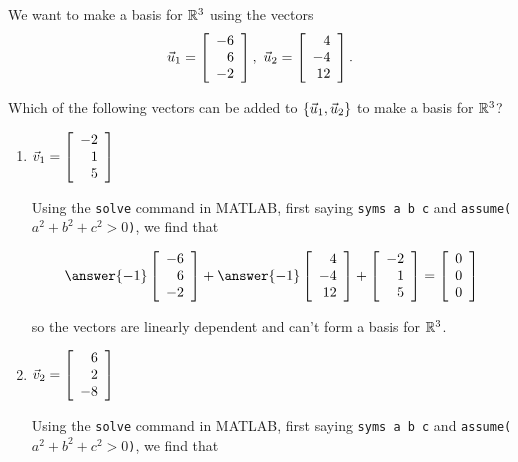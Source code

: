\documentclass{ximera}
\author{Zack Reed}
\begin{document}
\begin{exercise}

    We want to make a basis for $\R^3$ using the vectors
    \begin{equation*}
      \vect{u}_1 = \startmat{r} -6 \\ 6 \\ -2\stopmat,\quad
      \vect{u}_2 =\startmat{r} 4 \\ -4 \\ 12\stopmat.
    \end{equation*}

    Which of the following vectors can be added to $\set{\vect{u}_1,\vect{u}_2}$ to make a basis for $\R^3$?

    \begin{enumerate}
    \item $\vect{v}_1 = \startmat{r} -2 \\ 1 \\ 5\stopmat$ 
    \begin{problem}

        Using the \texttt{solve} command in MATLAB, first saying \texttt{syms a b c} and \texttt{assume($a^2+b^2+c^2>0$)}, we find that

        \begin{equation*}
        \answer{-1}\startmat{r} -6 \\ 6 \\ -2\stopmat + \answer{-1}\startmat{r} 4 \\ -4 \\ 12\stopmat + \startmat{r} -2 \\ 1 \\ 5\stopmat = \startmat{r} 0 \\ 0 \\ 0\stopmat
        \end{equation*}

        so the vectors are linearly dependent and can't form a basis for $\R^3$.

    \end{problem}
    \item $\vect{v}_2 = \startmat{r} 6 \\ 2 \\ -8\stopmat$ 

    
    \begin{problem}
        
        Using the \texttt{solve} command in MATLAB, first saying \texttt{syms a b c} and \texttt{assume($a^2+b^2+c^2>0$)}, we find that


\end{problem}
\end{enumerate}
\end{exercise}
\end{document}
